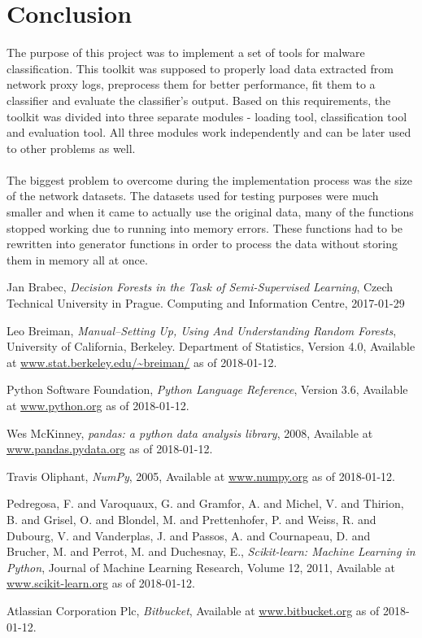 \documentclass[11pt]{article}
\begin{document}
  \section*{Conclusion}
    The purpose of this project was to implement a set of tools for malware classification. This toolkit was supposed to properly load data extracted from network proxy logs, preprocess them for better performance, fit them to a classifier and evaluate the classifier's output. Based on this requirements, the toolkit was divided into three separate modules - loading tool, classification tool and evaluation tool. All three modules work independently and can be later used to other problems as well.
    \\~\\
    The biggest problem to overcome during the implementation process was the size of the network datasets. The datasets used for testing purposes were much smaller and when it came to actually use the original data, many of the functions stopped working due to running into memory errors. These functions had to be rewritten into generator functions in order to process the data without storing them in memory all at once.
  \newpage
  \begin{thebibliography}{9}
      Jan Brabec,
      {\it Decision Forests in the Task of Semi-Supervised Learning},
      Czech Technical University in Prague. Computing and Information Centre, 
      2017-01-29

      Leo Breiman,
      {\it Manual--Setting Up, Using And Understanding Random Forests},
      University of California, Berkeley. Department of Statistics,
      Version 4.0,
      Available at \url{www.stat.berkeley.edu/~breiman/} as of 2018-01-12.
    
      Python Software Foundation,
      {\it Python Language Reference},
      Version 3.6,
      Available at \url{www.python.org} as of 2018-01-12.
 
      Wes McKinney,
      {\it pandas: a python data analysis library},
      2008,
      Available at \url{www.pandas.pydata.org} as of 2018-01-12.

      Travis Oliphant,
      {\it NumPy},
      2005,
      Available at \url{www.numpy.org} as of 2018-01-12.

      Pedregosa, F. and Varoquaux, G. and Gramfor, A. and Michel, V. and Thirion, B. and Grisel, O. and Blondel, M. and Prettenhofer, P. and Weiss, R. and Dubourg, V. and Vanderplas, J. and Passos, A. and Cournapeau, D. and Brucher, M. and Perrot, M. and Duchesnay, E.,
      {\it Scikit-learn: Machine Learning in Python},
      Journal of Machine Learning Research,
      Volume 12,
      2011,
      Available at \url{www.scikit-learn.org} as of 2018-01-12.

      Atlassian Corporation Plc,
      {\it Bitbucket},
      Available at \url{www.bitbucket.org} as of 2018-01-12.
       
  \end{thebibliography}
\end{document}
